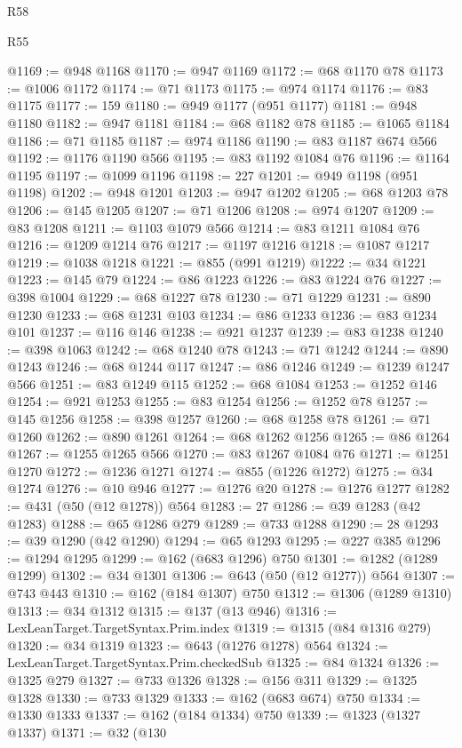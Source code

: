 \begin{lexlean}{R58}
\begin{lexlean}{R55}
\begin{coremodule}
{{{{{{{{{{{{{{{{{{{{{{{{{{{{{{{{{{{{{{{{{{{{{{{{{{{{{{{{{{{{{{@1169 := @948 @1168
@1170 := @947 @1169
@1172 := @68 @1170 @78
@1173 := @1006 @1172
@1174 := @71 @1173
@1175 := @974 @1174
@1176 := @83 @1175
@1177 := 159
@1180 := @949 @1177 (@951 @1177)
@1181 := @948 @1180
@1182 := @947 @1181
@1184 := @68 @1182 @78
@1185 := @1065 @1184
@1186 := @71 @1185
@1187 := @974 @1186
@1190 := @83 @1187 @674 @566
@1192 := @1176 @1190 @566
@1195 := @83 @1192 @1084 @76
@1196 := @1164 @1195
@1197 := @1099 @1196
@1198 := 227
@1201 := @949 @1198 (@951 @1198)
@1202 := @948 @1201
@1203 := @947 @1202
@1205 := @68 @1203 @78
@1206 := @145 @1205
@1207 := @71 @1206
@1208 := @974 @1207
@1209 := @83 @1208
@1211 := @1103 @1079 @566
@1214 := @83 @1211 @1084 @76
@1216 := @1209 @1214 @76
@1217 := @1197 @1216
@1218 := @1087 @1217
@1219 := @1038 @1218
@1221 := @855 (@991 @1219)
@1222 := @34 @1221
@1223 := @145 @79
@1224 := @86 @1223
@1226 := @83 @1224 @76
@1227 := @398 @1004
@1229 := @68 @1227 @78
@1230 := @71 @1229
@1231 := @890 @1230
@1233 := @68 @1231 @103
@1234 := @86 @1233
@1236 := @83 @1234 @101
@1237 := @116 @146
@1238 := @921 @1237
@1239 := @83 @1238
@1240 := @398 @1063
@1242 := @68 @1240 @78
@1243 := @71 @1242
@1244 := @890 @1243
@1246 := @68 @1244 @117
@1247 := @86 @1246
@1249 := @1239 @1247 @566
@1251 := @83 @1249 @115
@1252 := @68 @1084
@1253 := @1252 @146
@1254 := @921 @1253
@1255 := @83 @1254
@1256 := @1252 @78
@1257 := @145 @1256
@1258 := @398 @1257
@1260 := @68 @1258 @78
@1261 := @71 @1260
@1262 := @890 @1261
@1264 := @68 @1262 @1256
@1265 := @86 @1264
@1267 := @1255 @1265 @566
@1270 := @83 @1267 @1084 @76
@1271 := @1251 @1270
@1272 := @1236 @1271
@1274 := @855 (@1226 @1272)
@1275 := @34 @1274
@1276 := @10 @946
@1277 := @1276 @20
@1278 := @1276 @1277
@1282 := @431 (@50 (@12 @1278)) @564
@1283 := 27
@1286 := @39 @1283 (@42 @1283)
@1288 := @65 @1286 @279
@1289 := @733 @1288
@1290 := 28
@1293 := @39 @1290 (@42 @1290)
@1294 := @65 @1293
@1295 := @227 @385
@1296 := @1294 @1295
@1299 := @162 (@683 @1296) @750
@1301 := @1282 (@1289 @1299)
@1302 := @34 @1301
@1306 := @643 (@50 (@12 @1277)) @564
@1307 := @743 @443
@1310 := @162 (@184 @1307) @750
@1312 := @1306 (@1289 @1310)
@1313 := @34 @1312
@1315 := @137 (@13 @946)
@1316 := LexLeanTarget.TargetSyntax.Prim.index
@1319 := @1315 (@84 @1316 @279)
@1320 := @34 @1319
@1323 := @643 (@1276 @1278) @564
@1324 := LexLeanTarget.TargetSyntax.Prim.checkedSub
@1325 := @84 @1324
@1326 := @1325 @279
@1327 := @733 @1326
@1328 := @156 @311
@1329 := @1325 @1328
@1330 := @733 @1329
@1333 := @162 (@683 @674) @750
@1334 := @1330 @1333
@1337 := @162 (@184 @1334) @750
@1339 := @1323 (@1327 @1337)
@1371 := @32
    (@130
}}}}}}}}}}}}}}}}}}}}}}}}}}}}}}}}}}}}}}}}}}}}}}}}}}}}}}}}}}}}}}
\end{coremodule}
\end{lexlean}
\end{lexlean}

